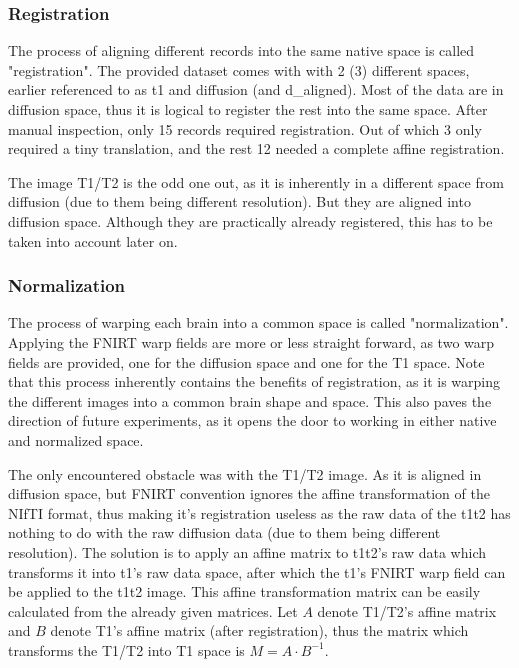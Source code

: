 \subsubsection{Registration}
The process of aligning different records into the same native space is called "registration". The provided dataset comes with with 2 (3) different spaces, earlier referenced to as t1 and diffusion (and d\_aligned). Most of the data are in diffusion space, thus it is logical to register the rest into the same space. After manual inspection, only 15 records required registration. Out of which 3 only required a tiny translation, and the rest 12 needed a complete affine registration.\par

The image T1/T2 is the odd one out, as it is inherently in a different space from diffusion (due to them being different resolution). But they are aligned into diffusion space. Although they are practically already registered, this has to be taken into account later on.

\subsubsection{Normalization}
The process of warping each brain into a common space is called "normalization". Applying the \ac{FNIRT} warp fields are more or less straight forward, as two warp fields are provided, one for the diffusion space and one for the T1 space. Note that this process inherently contains the benefits of registration, as it is warping the different images into a common brain shape and space. This also paves the direction of future experiments, as it opens the door to working in either native and normalized space.\par

The only encountered obstacle was with the T1/T2 image. As it is aligned in diffusion space, but \ac{FNIRT} convention ignores the affine transformation of the \ac{NIfTI} format, thus making it's registration useless as the raw data of the t1t2 has nothing to do with the raw diffusion data (due to them being different resolution). The solution is to apply an affine matrix to t1t2's raw data which transforms it into t1's raw data space, after which the t1's \ac{FNIRT} warp field can be applied to the t1t2 image. This affine transformation matrix can be easily calculated from the already given matrices. Let $A$ denote T1/T2's affine matrix and $B$ denote T1's affine matrix (after registration), thus the matrix which transforms the T1/T2 into T1 space is $M = A \cdot B^{-1}$.

